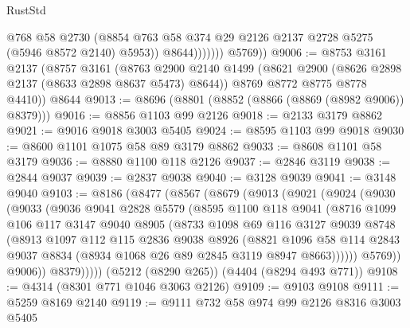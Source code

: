 \begin{lexlean}{RustStd}
\begin{coremodule}
                        @768
                        @58
                        @2730
                        (@8854 @763 @58 @374 @29 @2126 @2137 @2728 @5275 (@5946 @8572 @2140) @5953))
                      @8644)))))))
        @5769))
@9006 := @8753
    @3161
    @2137
    (@8757
      @3161
      (@8763
        @2900
        @2140
        @1499
        (@8621 @2900 (@8626 @2898 @2137 (@8633 @2898 @8637 @5473) @8644))
        @8769
        @8772
        @8775
        @8778
        @4410))
    @8644
@9013 := @8696 (@8801 (@8852 (@8866 (@8869 (@8982 @9006)) @8379)))
@9016 := @8856 @1103 @99 @2126
@9018 := @2133 @3179 @8862
@9021 := @9016 @9018 @3003 @5405
@9024 := @8595 @1103 @99 @9018
@9030 := @8600 @1101 @1075 @58 @89 @3179 @8862
@9033 := @8608 @1101 @58 @3179
@9036 := @8880 @1100 @118 @2126
@9037 := @2846 @3119
@9038 := @2844 @9037
@9039 := @2837 @9038
@9040 := @3128 @9039
@9041 := @3148 @9040
@9103 := @8186
    (@8477
      (@8567
        (@8679
          (@9013
            (@9021
              (@9024
                (@9030
                  (@9033
                    (@9036
                      @9041
                      @2828
                      @5579
                      (@8595
                        @1100
                        @118
                        @9041
                        (@8716
                          @1099
                          @106
                          @117
                          @3147
                          @9040
                          @8905
                          (@8733
                            @1098
                            @69
                            @116
                            @3127
                            @9039
                            @8748
                            (@8913
                              @1097
                              @112
                              @115
                              @2836
                              @9038
                              @8926
                              (@8821
                                @1096
                                @58
                                @114
                                @2843
                                @9037
                                @8834
                                (@8934 @1068 @26 @89 @2845 @3119 @8947 @8663))))))
                      @5769))
                  @9006))
              @8379)))))
    (@5212 (@8290 @265))
    (@4404 (@8294 @493 @771))
@9108 := @4314 (@8301 @771 @1046 @3063 @2126)
@9109 := @9103 @9108
@9111 := @5259 @8169 @2140
@9119 := @9111 @732 @58 @974 @99 @2126 @8316 @3003 @5405

\end{coremodule}
\end{lexlean}
